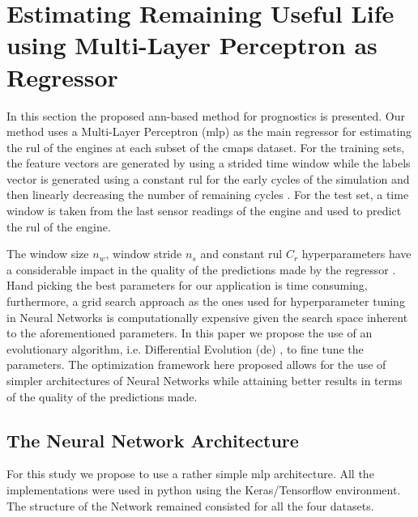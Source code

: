 \section{Estimating Remaining Useful Life using Multi-Layer Perceptron as Regressor}
\label{sec:method}

In this section the proposed \gls{ann}-based method for prognostics is presented. Our method uses a Multi-Layer Perceptron (\gls{mlp}) as the main regressor for estimating the \gls{rul} of the engines at each subset of the \gls{cmaps} dataset. For the training sets, the feature vectors are generated by using a strided time window while the labels vector is generated using a constant \gls{rul} for the early cycles of the simulation and then linearly decreasing the number of remaining cycles \cite{Li2018, Lim2016}. For the test set, a time window is taken from the last sensor readings of the engine and used to predict the \gls{rul} of the engine. 

The window size $n_w$, window stride $n_s$ and constant \gls{rul} $C_r$ hyperparameters have a considerable impact in the quality of the predictions made by the regressor \cite{Li2018, Lim2016}. Hand picking the best parameters for our application is time consuming, furthermore, a grid search approach as the ones used for hyperparameter tuning in Neural Networks is computationally expensive given the search space inherent to the aforementioned parameters. In this paper we propose the use of an evolutionary algorithm, i.e. Differential Evolution (\gls{de}) \cite{Storn1997}, to fine tune the parameters. The optimization framework here proposed allows for the use of simpler architectures of Neural Networks while attaining better results in terms of the quality of the predictions made.



\subsection{The Neural Network Architecture}

For this study we propose to use a rather simple \gls{mlp} architecture. All the implementations were used in python using the Keras/Tensorflow environment. The structure of the Network remained consisted for all the four datasets.

